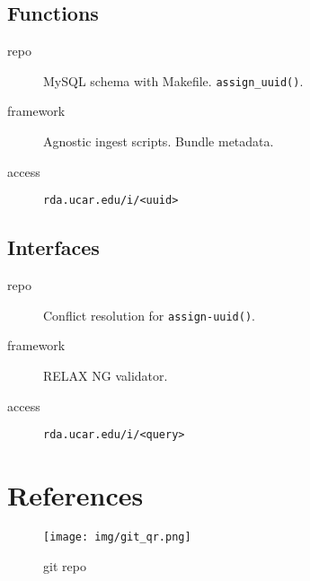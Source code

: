 \documentclass{beamer}
\begin{document}
\subsection{Functions}

\begin{frame}
    \begin{description}
        \item[repo] MySQL schema with Makefile. \texttt{assign\_uuid()}.
        \item[framework] Agnostic ingest scripts.  Bundle metadata.
        \item[access] \texttt{rda.ucar.edu/i/<uuid>}
    \end{description}
\end{frame}

\subsection{Interfaces}
\begin{frame}
    \begin{description}
        \item[repo] Conflict resolution for \texttt{assign-uuid()}.
        \item[framework] RELAX NG validator.
        \item[access] \texttt{rda.ucar.edu/i/<query>}
    \end{description}
\end{frame}

\section{References}
\begin{frame}
    \begin{figure}
        \texttt{[image: img/git\_qr.png]}
        \caption{git repo}
    \end{figure}
\end{frame}
\end{document}
